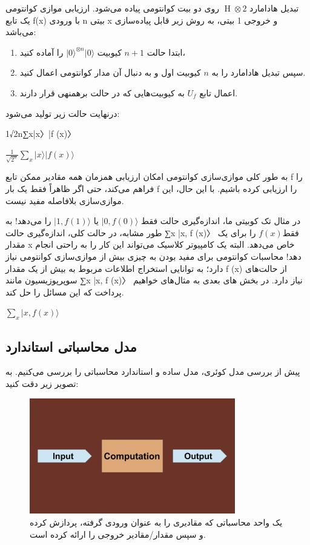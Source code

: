 \documentclass{book}
\begin{document}
تبدیل هادامارد $\operatorname{H} \otimes 2$ روی دو بیت کوانتومی پیاده می‌شود. ارزیابی موازی کوانتومی یک تابع f(x) با ورودی n بیتی x و خروجی 1 بیتی، به روش زیر قابل پیاده‌سازی می‌باشد:

\begin{enumerate}
	\item ابتدا حالت $n + 1$ کیوبیت $\vert0\rangle^{\otimes n} \vert 0\rangle$ را آماده کنید،
	\item سپس تبدیل هادامارد را به $n$ کیوبیت اول و به دنبال آن مدار کوانتومی اعمال کنید.
	\item اعمال تابع $U_{f}$ به کیوبیت‌هایی که در حالت برهمنهی قرار دارند.
\end{enumerate}
درنهایت حالت زیر تولید ‌می‌شود:

1√2n∑x|x〉|f (x)〉

\begin{center}
	$\frac{1}{\sqrt{2^n}} \sum_{x} \vert x \rangle \vert f (x)\rangle$ 
\end{center}


به طور کلی موازی‌سازی کوانتومی امکان ارزیابی همزمان همه مقادیر ممکن تابع f را فراهم می‌کند، حتی اگر ظاهراً فقط یک بار f را ارزیابی کرده باشیم. با این حال، این موازی‌سازی بلافاصله مفید نیست. 


در مثال تک کوبیتی ما، اندازه‌گیری حالت فقط $\vert 0, f(0)\rangle$ یا $\vert 1, f(1)\rangle$ را می‌دهد! به طور مشابه، در حالت کلی، اندازه‌گیری حالت ∑x |x, f (x)〉 فقط$ f (x)$ را برای یک مقدار x خاص می‌دهد. البته یک کامپیوتر کلاسیک می‌تواند این کار را به راحتی انجام دهد! محاسبات کوانتومی برای مفید بودن به چیزی بیش از موازی‌سازی کوانتومی نیاز دارد؛ به توانایی استخراج اطلاعات مربوط به بیش از یک مقدار f (x) از حالت‌های سوپرپوزیسیون مانند ∑x |x, f (x)〉 نیاز دارد. 
در بخش های بعدی به مثال‌های خواهیم پرداخت که این مسائل را حل کند.



$\sum_{x} \vert x, f(x)\rangle$

\newpage
\subsection{مدل محاسباتی استاندارد}
پیش از بررسی مدل کوئری،‌ مدل ساده و استاندارد محاسباتی را بررسی می‌کنیم. به تصویر زیر دقت کنید:

\begin{figure}[ht]
	\centering
	\includegraphics[width=0.8\textwidth]{standard computation model.png}
	\caption{یک واحد محاسباتی که مقادیری را به عنوان ورودی گرفته، پردازش کرده و سپس مقدار/مقادیر خروجی را ارائه کرده است.}
\end{figure}
\end{document}
